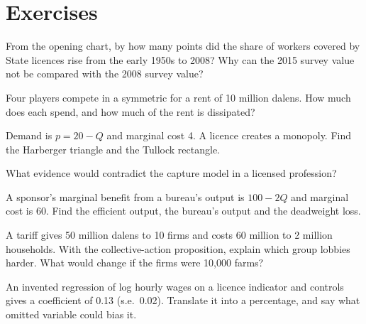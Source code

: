 \section{Exercises}\label{sec:b3:interest-groups-and-regulation:exercises}

\begin{exercise}[$\star$]\label{exo:b3:interest-groups-and-regulation:1}
From the opening chart, by how many points did the share of workers covered by
State licences rise from the early 1950s to 2008? Why can the 2015 survey value not be
compared with the 2008 survey value?
\end{exercise}

\begin{exercise}[$\star$]\label{exo:b3:interest-groups-and-regulation:2}
Four players compete in a symmetric  for a rent of 10 million dalens. How
much does each spend, and how much of the rent is dissipated?
\end{exercise}

\begin{exercise}[$\star$]\label{exo:b3:interest-groups-and-regulation:3}
Demand is $p = 20 - Q$ and marginal cost 4. A licence creates a monopoly. Find the Harberger
triangle and the Tullock rectangle.
\end{exercise}

\begin{exercise}[$\star$]\label{exo:b3:interest-groups-and-regulation:4}
What evidence would contradict the capture model in a licensed profession?
\end{exercise}

\begin{exercise}[$\star\star$]\label{exo:b3:interest-groups-and-regulation:5}
A sponsor's marginal benefit from a bureau's output is $100 - 2Q$ and marginal cost is 60. Find
the efficient output, the bureau's output and the deadweight loss.
\end{exercise}

\begin{exercise}[$\star\star$]\label{exo:b3:interest-groups-and-regulation:6}
A tariff gives 50 million dalens to 10 firms and costs 60 million to 2 million households.
With the collective-action proposition, explain which group lobbies harder. What
would change if the firms were 10{,}000 farms?
\end{exercise}

\begin{exercise}[$\star\star$]\label{exo:b3:interest-groups-and-regulation:7}
An invented regression of log hourly wages on a licence indicator and controls
gives a coefficient of 0.13 (s.e.\ 0.02). Translate it into a percentage, and say what
omitted variable could bias it.
\end{exercise}

